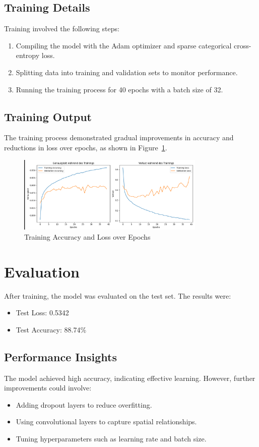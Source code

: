 \documentclass[12pt,a4paper]{article}
\begin{document}
\subsection*{Training Details}
Training involved the following steps:
\begin{enumerate}
    \item Compiling the model with the Adam optimizer and sparse categorical cross-entropy loss.
    \item Splitting data into training and validation sets to monitor performance.
    \item Running the training process for 40 epochs with a batch size of 32.
\end{enumerate}

\subsection*{Training Output}
The training process demonstrated gradual improvements in accuracy and reductions in loss over epochs, as shown in Figure~\ref{fig:training-curves}.

\begin{figure}[h!]
    \centering
    \includegraphics[width=0.8\textwidth]{image.png}
    \caption{Training Accuracy and Loss over Epochs}
    \label{fig:training-curves}
\end{figure}

\section*{Evaluation}
After training, the model was evaluated on the test set. The results were:
\begin{itemize}
    \item Test Loss: 0.5342
    \item Test Accuracy: 88.74\%
\end{itemize}

\subsection*{Performance Insights}
The model achieved high accuracy, indicating effective learning. However, further improvements could involve:
\begin{itemize}
    \item Adding dropout layers to reduce overfitting.
    \item Using convolutional layers to capture spatial relationships.
    \item Tuning hyperparameters such as learning rate and batch size.
\end{itemize}
\end{document}
